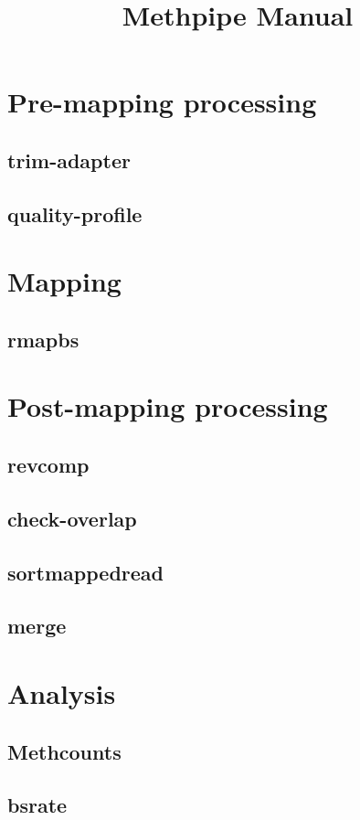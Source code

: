 \documentclass[11pt]{report}
\title{Methpipe Manual}
\date{}
\begin{document}
\maketitle

\section{Pre-mapping processing}
\label{sec:premapping}

\subsection{trim-adapter}
\label{sec:trim-adapter}

\subsection{quality-profile}
\label{sec:qual-profile}



\section{Mapping}
\label{sec:mapping}

\subsection{rmapbs}
\label{sec:rmapbs}


\section{Post-mapping processing}
\label{sec:postmapping}

\subsection{revcomp}
\label{sec:revcomp}

\subsection{check-overlap}
\label{sec:check-overlap}

\subsection{sortmappedread}
\label{sec:sort}

\subsection{merge}
\label{sec:merge}

\section{Analysis}
\label{sec:analysis}

\subsection{Methcounts}
\label{sec:methcount}

\subsection{bsrate}
\label{sec:bsrate}
\end{document}
